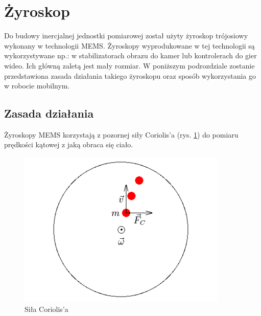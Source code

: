 \section{Żyroskop}
\label{sec:gyro}
Do budowy inercjalnej jednostki pomiarowej został użyty żyroskop trójosiowy
wykonany w technologii MEMS. Żyroskopy wyprodukowane w tej technologii są
wykorzystywane np.: w stabilizatorach obrazu do kamer lub kontrolerach do gier
wideo. Ich główną zaletą jest mały rozmiar. W poniższym podrozdziale zostanie 
przedstawiona zasada działania takiego żyroskopu oraz sposób wykorzystania go w
robocie mobilnym.

\subsection{Zasada działania}

Żyroskopy MEMS korzystają z pozornej siły Coriolis'a (rys. \ref{fig:Coriolis}) do
pomiaru prędkości kątowej z jaką obraca się ciało. 

\begin{figure}[!ht]
 \centering \includegraphics[height=75mm]{../images/ch04/coriolis.png}
 \caption{Siła Coriolis'a}
 \label{fig:Coriolis}
\end{figure}

